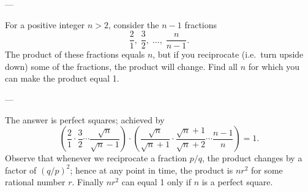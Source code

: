 
---

For a positive integer $n>2$, consider the $n-1$ fractions
\[\dfrac21,\;\dfrac32,\;\ldots,\;\frac n{n-1}.\]
The product of these fractions equals $n$, but if you reciprocate (i.e.\ turn upside down) some of the fractions, the product will change. Find all $n$ for which you can make the product equal 1.

---

The answer is perfect squares; achieved by
\[\left(\frac21\cdot\frac32\cdots\frac{\sqrt n}{\sqrt n-1}\right)\cdot\left(\frac{\sqrt n}{\sqrt n+1}\cdot\frac{\sqrt n+1}{\sqrt n+2}\cdots\frac{n-1}n\right)=1.\]
Observe that whenever we reciprocate a fraction $p/q$, the product changes by a factor of $(q/p)^2$; hence at any point in time, the product is $nr^2$ for some rational number $r$. Finally $nr^2$ can equal 1 only if $n$ is a perfect square.
